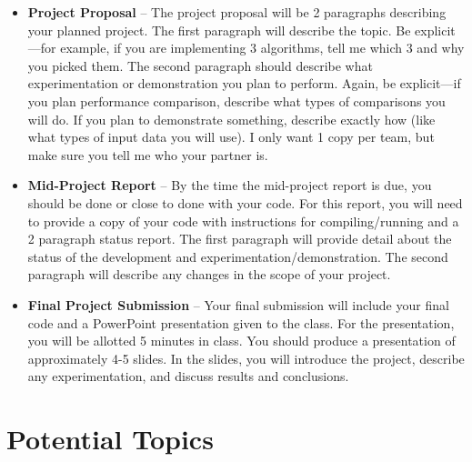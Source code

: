 \documentclass[a4paper,12pt]{article}
\begin{document}
\begin{itemize}
    \item \textbf{Project Proposal} -- The project proposal will be 2 paragraphs describing your planned project. The first paragraph will describe the topic. Be explicit---for example, if you are implementing 3 algorithms, tell me which 3 and why you picked them. The second paragraph should describe what experimentation or demonstration you plan to perform. Again, be explicit---if you plan performance comparison, describe what types of comparisons you will do. If you plan to demonstrate something, describe exactly how (like what types of input data you will use). I only want 1 copy per team, but make sure you tell me who your partner is.
    
    \item \textbf{Mid-Project Report} -- By the time the mid-project report is due, you should be done or close to done with your code. For this report, you will need to provide a copy of your code with instructions for compiling/running and a 2 paragraph status report. The first paragraph will provide detail about the status of the development and experimentation/demonstration. The second paragraph will describe any changes in the scope of your project.
    
    \item \textbf{Final Project Submission} -- Your final submission will include your final code and a PowerPoint presentation given to the class. For the presentation, you will be allotted 5 minutes in class. You should produce a presentation of approximately 4-5 slides. In the slides, you will introduce the project, describe any experimentation, and discuss results and conclusions. 
        
\end{itemize}


\section{Potential Topics}

\end{document}
